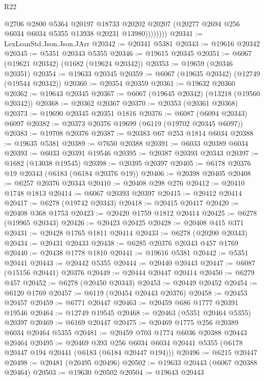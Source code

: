 \begin{lexlean}{R22}
\begin{coremodule}
                  @2706
                  @2800
                  @5364
                  @20197
                  @18733
                  @20202
                  @20207
                  (@20277 @2694 @256 @6034 @6034 @5355 @13938 @20231 @13980))))))))
@20341 := LexLeanStd.Json.Json.JArr
@20342 := @20341 @5381
@20343 := @19616 @20342
@20345 := @5351 @20343 @5355
@20346 := @19615 @20345
@20351 := @6067 (@19621 @20342) (@1682 (@19624 @20342))
@20353 := @19659 (@20346 @20351)
@20354 := @19633 @20345
@20359 := @6067 (@19635 @20342) (@12749 (@19544 @20342))
@20360 := @20354 @20359
@20361 := @19632 @20360
@20362 := @19643 @20345
@20367 := @6067 (@19645 @20342) (@13218 (@19560 @20342))
@20368 := @20362 @20367
@20370 := @20353 (@20361 @20368)
@20373 := @19690 @20345 @20351 @1816
@20376 := @6087 (@6094 @20343) @6097
@20382 := @20373 @20376 @19699 (@6119 (@19702 @20345 @6097))
@20383 := @19708 @20376
@20387 := @20383 @67 @253 @1814 @6034
@20388 := @19635 @5381
@20389 := @7650 @20388
@20391 := @6033 @20389 @6034
@20393 := @6033 @20391 @19546
@20395 := @20387 @20393 @20343
@20397 := @1682 (@13038 @19545)
@20398 := @20395 @20397
@20405 := @6178 @20376 @19 @20343 (@6183 (@6184 @20376 @19))
@20406 := @20398 @20405
@20408 := @6257 @20376 @20343
@20410 := @20408 @298 @276
@20412 := @20410 @1748 @1813
@20414 := @6067 @20393 @20397
@20415 := @20412 @20414
@20417 := @6278 (@19742 @20343)
@20418 := @20415 @20417
@20420 := @20408 @368 @1753
@20423 := @20420 @1759 @1812 @20414
@20425 := @6278 (@19965 @20343)
@20426 := @20423 @20425
@20428 := @20408 @415 @371
@20431 := @20428 @1765 @1811 @20414
@20433 := @6278 (@20200 @20343)
@20434 := @20431 @20433
@20438 := @6285 @20376 @20343 @457 @1769
@20440 := @20438 @1778 @1810
@20441 := @19616 @5381
@20442 := @5351 @20441
@20443 := @20442 @5355
@20444 := @20440 @20443
@20447 := @6087 (@15156 @20441) @20376
@20449 := @20444 @20447 @20414
@20450 := @6279 @457
@20452 := @6278 (@20450 @20343)
@20453 := @20449 @20452
@20454 := @6120 @1769
@20457 := @6119 (@20454 @20443 @20376)
@20458 := @20453 @20457
@20459 := @6771 @20447
@20463 := @20459 @686 @1777 @20391 @19546
@20464 := @12749 @19545
@20468 := @20463 (@5351 @20464 @5355) @20397
@20469 := @6169 @20447
@20475 := @20469 @1775 @256 @20389 @6034 @20464 @5355
@20481 := @20459 @703 @1774 @6036 @20388 @20443 @20464
@20495 := @20469
    @393
    @256
    @6034
    @6034
    @20441
    @5355
    (@6178 @20447 @194 @20441 (@6183 (@6184 @20447 @194)))
@20496 := @6215 @20447
@20498 := @20481 (@20495 @20496)
@20502 := @19633 @20443 (@6067 @20388 @20464)
@20503 := @19630 @20502
@20504 := @19643 @20443

\end{coremodule}
\end{lexlean}

